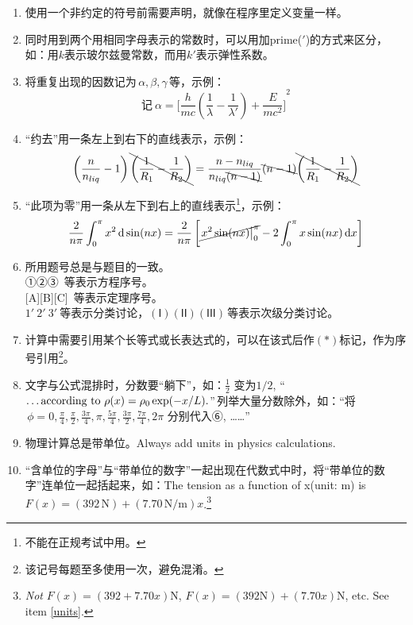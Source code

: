 \documentclass[11pt, a4paper]{article}
\newcommand\diff{\,\mathrm{d}}
\newcommand\Newton{\mathrm{N}}
\begin{document}
\begin{enumerate}
\item 使用一个非约定的符号前需要声明，就像在程序里定义变量一样。
\item 同时用到两个用相同字母表示的常数时，可以用加prime($'$)的方式来区分，如：用$k$表示玻尔兹曼常数，而用$k'$表示弹性系数。
\item \label{bracket}将重复出现的因数记为$\,\alpha ,\beta ,\gamma\,$等，示例：
    \begin{displaymath}
    \text{记}\ \alpha = {\biggl[ \frac{h}{mc} \left( \frac{1}{\lambda} - \frac{1}{\lambda'} \right) + \frac{E}{mc^{2}}\biggr]}^{2}
    \end{displaymath}
\item “约去”用一条左上到右下的直线表示，示例：
    \begin{displaymath}
    \left( \frac{n}{n_{liq}} - 1 \right) \bcancel{\left( \frac{1}{R_{1}} - \frac{1}{R_{2}} \right)} =
    \frac{n - n_{liq}}{n_{liq} \bcancel{(n-1)}} \bcancel{(n-1)} \bcancel{\left( \frac{1}{R_{1}} - \frac{1}{R_{2}} \right)}
    \end{displaymath}
\item “此项为零”用一条从左下到右上的直线表示\footnote{不能在正规考试中用。}，示例：
    \begin{displaymath}
    \frac{2}{n\pi}\int_{0}^{\pi} x^{2} \diff \sin(nx) =
    \frac{2}{n\pi} \left[ \cancel{\left.x^{2}\sin(nx)\right|_{0}^{\pi}} - 2\int_{0}^{\pi} x\sin(nx) \diff x \right]
    \end{displaymath}
\item 所用题号总是与题目的一致。\\
    ①②③\, 等表示方程序号。\\[0pt]
    [A][B][C]\, 等表示定理序号。\\
    $1'\  2'\  3'\ $等表示分类讨论，$(\mathsf{I})(\mathsf{II})(\mathsf{III})\,$等表示次级分类讨论。
\item 计算中需要引用某个长等式或长表达式的，可以在该式后作$(*)$标记，作为序号引用\footnote{该记号每题至多使用一次，避免混淆。}。
\item 文字与公式混排时，分数要“躺下”，如：$\frac{1}{2}$ 变为$1/2$, ``$\text{\dots according to}\ \rho(x) = \rho_{0}\exp(-x/L).$''\,列举大量分数除外，如：“将$\, \phi = 0, \frac{\pi}{4}, \frac{\pi}{2}, \frac{3\pi}{4}, \pi, \frac{5\pi}{4}, \frac{3\pi}{2}, \frac{7\pi}{4}, 2\pi$ 分别代入⑥, ……”
\item \label{units}物理计算总是带单位。Always add units in physics calculations.
\item “含单位的字母”与“带单位的数字”一起出现在代数式中时，将“带单位的数字”连单位一起括起来，如：The tension as a function of x{\scriptsize(unit: m)} is $F(x) = (392\,\Newton) + (7.70\,\Newton/\mathrm{m})x$.\footnote{\emph{Not} $F(x) = (392 + 7.70x)\Newton$, $F(x) = (392\Newton) + (7.70x)\Newton$, etc. See item \ref{units}.}



\end{enumerate}
\end{document}
